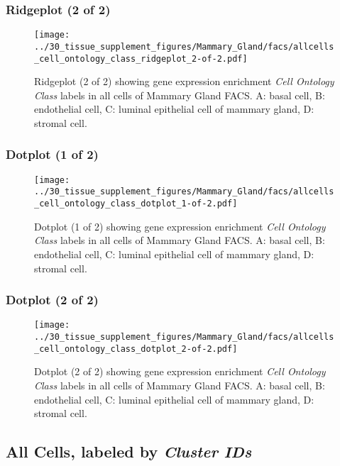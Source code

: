 \clearpage

\subsubsection{Ridgeplot (2 of 2)}
\begin{figure}[h]
\centering
\texttt{[image: ../30\_tissue\_supplement\_figures/Mammary\_Gland/facs/allcells\_cell\_ontology\_class\_ridgeplot\_2-of-2.pdf]}

\caption{ Ridgeplot (2 of 2)  showing gene expression enrichment \emph{Cell Ontology Class} labels in all cells of Mammary Gland FACS. A: basal cell, B: endothelial cell, C: luminal epithelial cell of mammary gland, D: stromal cell.}
\end{figure}


\clearpage

\subsubsection{Dotplot (1 of 2)}
\begin{figure}[h]
\centering
\texttt{[image: ../30\_tissue\_supplement\_figures/Mammary\_Gland/facs/allcells\_cell\_ontology\_class\_dotplot\_1-of-2.pdf]}

\caption{ Dotplot (1 of 2)  showing gene expression enrichment \emph{Cell Ontology Class} labels in all cells of Mammary Gland FACS. A: basal cell, B: endothelial cell, C: luminal epithelial cell of mammary gland, D: stromal cell.}
\end{figure}


\clearpage

\subsubsection{Dotplot (2 of 2)}
\begin{figure}[h]
\centering
\texttt{[image: ../30\_tissue\_supplement\_figures/Mammary\_Gland/facs/allcells\_cell\_ontology\_class\_dotplot\_2-of-2.pdf]}

\caption{ Dotplot (2 of 2)  showing gene expression enrichment \emph{Cell Ontology Class} labels in all cells of Mammary Gland FACS. A: basal cell, B: endothelial cell, C: luminal epithelial cell of mammary gland, D: stromal cell.}
\end{figure}


\clearpage

\subsection{All Cells, labeled by \emph{Cluster IDs}}
